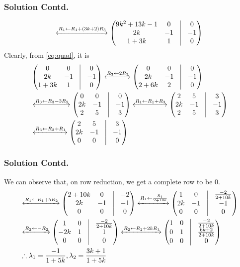 \documentclass{beamer}
\newcommand{\myvec}[1]{\ensuremath{\begin{pmatrix}#1\end{pmatrix}}}
\begin{document}
\begin{frame}
\frametitle{Solution Contd.}
\begin{align}
    \xleftrightarrow{R_1\leftarrow R_1+(3k+2)R_3}\myvec{9k^2+13k-1& 0 & \vrule & 0\\
    2k & -1 & \vrule & -1\\
    1+3k &  1 & \vrule & 0}
\end{align}
Clearly, from \eqref{eq:quad}, it is
\begin{align}
    &\myvec{0 & 0 & \vrule & 0\\
    2k & -1 & \vrule & -1\\
    1+3k &  1 & \vrule & 0}\xleftrightarrow{R_3\leftarrow2R_3}\myvec{0 & 0 & \vrule & 0\\
    2k & -1 & \vrule & -1\\
    2+6k &  2 & \vrule & 0}\\&\xleftrightarrow{R_3\leftarrow R_3-3R_2}\myvec{0 & 0 & \vrule & 0\\
    2k & -1 & \vrule & -1\\
    2 &  5 & \vrule & 3}\xleftrightarrow{R_1\leftarrow R_1+R_3}\myvec{2 & 5 & \vrule & 3\\
    2k & -1 & \vrule & -1\\
    2 &  5 & \vrule & 3}\\&\xleftrightarrow{R_3\leftarrow R_3+R_1}\myvec{2 & 5 & \vrule & 3\\
    2k & -1 & \vrule & -1\\
    0 &  0 & \vrule & 0}
\end{align}
\end{frame}

\begin{frame}
\frametitle{Solution Contd.}
We can observe that, on row reduction, we get a complete row to be $0$. 
\begin{align}
    &\xleftrightarrow{R_1\leftarrow R_{1}+5R_{2}}
	\myvec{2+10k & 0 & \vrule & -2 \\
	2k & -1 & \vrule & -1 \\
	0 & 0 & \vrule & 0}\xleftrightarrow{R_1\leftarrow \frac{R_{1}}{2+10k}}
	\myvec{1 & 0 & \vrule & \frac{-2}{2+10k} \\
	2k & -1 & \vrule & -1 \\
	0 & 0 & \vrule & 0}\\
	&\xleftrightarrow{R_2\leftarrow -R_{2}}
	\myvec{1 & 0 & \vrule & \frac{-2}{2+10k} \\
	-2k & 1 & \vrule & 1 \\
	0 & 0 & \vrule & 0}\xleftrightarrow{R_2\leftarrow R_{2}+2kR_{1}}
	\myvec{1 & 0 & \vrule & \frac{-2}{2+10k} \\
	0 & 1 & \vrule & \frac{6k+2}{2+10k} \\
	0 & 0 & \vrule & 0}\\
	&\therefore \lambda_{1}=\frac{-1}{1+5k},\lambda_{2}=\frac{3k+1}{1+5k}
\end{align}
\end{frame}
\end{document}
